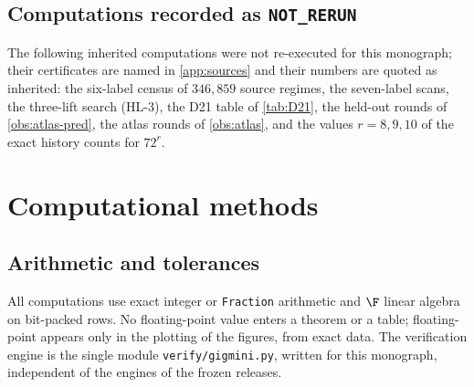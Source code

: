 \section{Computations recorded as \texttt{NOT\_RERUN}}
The following inherited computations were not re-executed for this monograph; their certificates are named in \cref{app:sources} and their numbers are quoted as inherited: the six-label census of $346{,}859$ source regimes, the seven-label scans, the three-lift search (HL-3), the D21 table of \cref{tab:D21}, the held-out rounds of \cref{obs:atlas-pred}, the atlas rounds of \cref{obs:atlas}, and the values $r=8,9,10$ of the exact history counts for $72^r$.

\chapter{Computational methods}\label{app:methods}
\section{Arithmetic and tolerances}
All computations use exact integer or \texttt{Fraction} arithmetic and $\F$ linear algebra on bit-packed rows. No floating-point value enters a theorem or a table; floating-point appears only in the plotting of the figures, from exact data. The verification engine is the single module \texttt{verify/gigmini.py}, written for this monograph, independent of the engines of the frozen releases.

